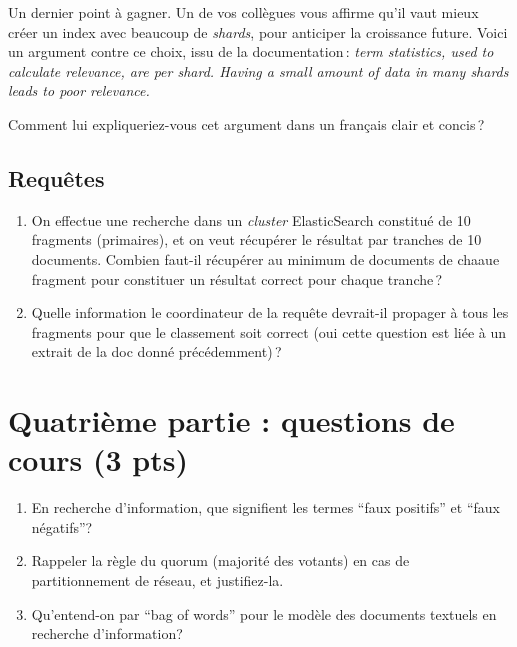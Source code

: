 \documentclass[11pt,a4paper]{article}
\begin{document}
Un dernier point à gagner. Un de vos collègues vous affirme qu'il vaut mieux
créer un index avec beaucoup de \textit{shards}, pour anticiper la croissance future. Voici
un argument contre ce choix, issu de la documentation\,:
\textit{term statistics, used to calculate relevance, are per shard. Having a small amount of 
data in many shards leads to poor relevance.} 

Comment lui expliqueriez-vous cet argument dans un français clair et concis\,?

\subsection*{Requêtes}

\begin{enumerate}

  \item On effectue une recherche dans un \textit{cluster} ElasticSearch constitué de 10 fragments (primaires), et on veut récupérer
      le résultat par tranches de 10 documents. Combien faut-il récupérer au minimum de documents de chaaue 
      fragment pour constituer un résultat correct pour chaque tranche\,? 

  \item Quelle information le coordinateur de la requête
    devrait-il propager à tous les fragments pour que le classement soit correct (oui cette question est liée
    à un extrait de la doc donné précédemment)\,? 

 \end{enumerate}



\section*{Quatrième partie : questions de cours (3 pts)}


\begin{enumerate}
  \item En recherche d’information, que signifient les termes ``faux positifs'' et ``faux négatifs''?
  \item Rappeler la règle du quorum (majorité des votants) en cas de partitionnement de réseau, et justifiez-la.
   \item Qu’entend-on par ``bag of words'' pour le modèle des documents textuels en recherche d’information?
\end{enumerate}
\end{document}
